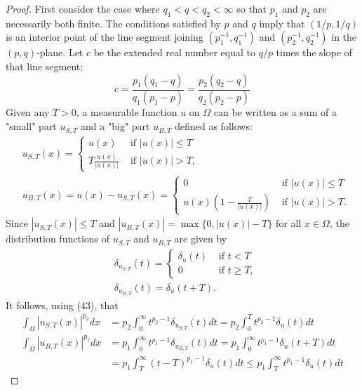 \begin{proof}
  First consider the case where $q_1<q<q_2<\infty$ so that $p_1$ and $p_2$ are necessarily both finite. The conditions satisfied by $p$ and $q$ imply that $(1 / p, 1 / q)$ is an interior point of the line segment joining $\left(p_1^{-1}, q_1^{-1}\right)$ and $\left(p_2^{-1}, q_2^{-1}\right)$ in the $(p, q)$-plane. Let $c$ be the extended real number equal to $q / p$ times the slope of
  that line segment;
  \[
  c=\frac{p_1\left(q_1-q\right)}{q_1\left(p_1-p\right)}=\frac{p_2\left(q_2-q\right)}{q_2\left(p_2-p\right)}
  \]
  Given any $T>0$, a measurable function $u$ on $\Omega$ can be written as a sum of a "small" part $u_{S, T}$ and a "big" part $u_{B, T}$ defined as follows:
  \[
  \begin{aligned}
  & u_{S, T}(x)= \begin{cases}u(x) & \text { if }|u(x)| \leq T \\
  T \frac{u(x)}{|u(x)|} & \text { if }|u(x)|>T,\end{cases} \\
  & u_{B, T}(x)=u(x)-u_{S, T}(x)= \begin{cases}0 & \text { if }|u(x)| \leq T \\
  u(x)\left(1-\frac{T}{|u(x)|}\right) & \text { if }|u(x)|>T .\end{cases}
  \end{aligned}
  \]
  Since $\left|u_{S, T}(x)\right| \leq T$ and $\left|u_{B, T}(x)\right|=\max \{0,|u(x)|-T\}$ for all $x \in \Omega$, the distribution functions of $u_{S, T}$ and $u_{B, T}$ are given by
  \[
  \begin{aligned}
  & \delta_{u_{S, T}}(t)= \begin{cases}\delta_u(t) & \text { if } t<T \\
  0 & \text { if } t \geq T,\end{cases} \\
  & \delta_{u_{B, T}}(t)=\delta_u(t+T) .
  \end{aligned}
  \]
  It follows, using (43), that
  \[
  \begin{aligned}
  \int_{\Omega}\left|u_{S, T}(x)\right|^{p_2} d x & =p_2 \int_0^{\infty} t^{p_2-1} \delta_{u_{S, T}}(t) d t=p_2 \int_0^T t^{p_2-1} \delta_u(t) d t \\
  \int_{\Omega}\left|u_{B, T}(x)\right|^{p_1} d x & =p_1 \int_0^{\infty} t^{p_1-1} \delta_{u_{B, T}}(t) d t=p_1 \int_0^{\infty} t^{p_1-1} \delta_u(t+T) d t \\
  & =p_1 \int_T^{\infty}(t-T)^{p_1-1} \delta_u(t) d t \leq p_1 \int_T^{\infty} t^{p_1-1} \delta_u(t) d t

\end{aligned}\]
\end{proof}
